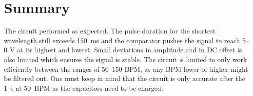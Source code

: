 \section{Summary}\label{sec:temp_summary}
The circuit performed as expected. The pulse duration for the shortest wavelength still exceeds \SI{150}{\milli\second} and the comparator pushes the signal to reach \numrange{5}{0} \si{\volt} at its highest and lowest. Small deviations in amplitude and in DC offset is also limited which ensures the signal is stable. The circuit is limited to only work efficiently between the ranges of \numrange{50}{150} BPM, as any BPM lower or higher might be filtered out. One must keep in mind that the circuit is only accurate after the \SI{1}{\second} at \SI{50}{BPM} as the capacitors need to be charged.



